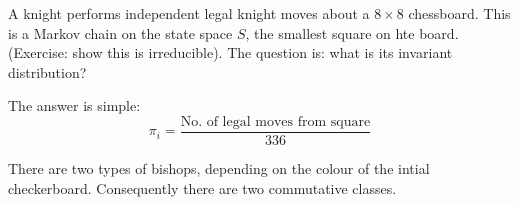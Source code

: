 \documentclass[a4paper]{article}
\begin{document}
\begin{eg}
  A knight performs independent legal knight moves about a \(8 \times 8\) chessboard. This is a Markov chain on the state space \(S\), the smallest square on hte board. (Exercise: show this is irreducible). The question is: what is its invariant distribution?

  The answer is simple:
  \[
    \pi_i = \frac{\text{No. of legal moves from square}}{336}
  \]
\end{eg}

\begin{ex}
  There are two types of bishops, depending on the colour of the intial checkerboard. Consequently there are two commutative classes.
\end{ex}

\iffalse
\appendix

\section{Resources}


Reading list: Probability, an introduction Grimmett, Welsh, 2nd edition, Chapter 12

\fi
\end{document}
